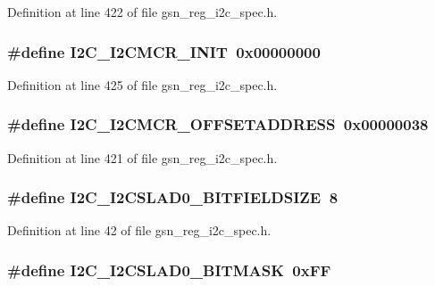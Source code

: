 Definition at line 422 of file gsn\_\-reg\_\-i2c\_\-spec.h.

\hypertarget{a00558_a619479ba7fc7ed7ca7f09d41a08fec86}{
\subsubsection[{I2C\_\-I2CMCR\_\-INIT}]{\setlength{\rightskip}{0pt plus 5cm}\#define I2C\_\-I2CMCR\_\-INIT~0x00000000}}
\label{a00558_a619479ba7fc7ed7ca7f09d41a08fec86}


Definition at line 425 of file gsn\_\-reg\_\-i2c\_\-spec.h.

\hypertarget{a00558_a7c8d88c13df3cf38f1ce4a66bae7abb4}{
\subsubsection[{I2C\_\-I2CMCR\_\-OFFSETADDRESS}]{\setlength{\rightskip}{0pt plus 5cm}\#define I2C\_\-I2CMCR\_\-OFFSETADDRESS~0x00000038}}
\label{a00558_a7c8d88c13df3cf38f1ce4a66bae7abb4}


Definition at line 421 of file gsn\_\-reg\_\-i2c\_\-spec.h.

\hypertarget{a00558_aa7c527f9286485d4a2162c2907c4386d}{
\subsubsection[{I2C\_\-I2CSLAD0\_\-BITFIELDSIZE}]{\setlength{\rightskip}{0pt plus 5cm}\#define I2C\_\-I2CSLAD0\_\-BITFIELDSIZE~8}}
\label{a00558_aa7c527f9286485d4a2162c2907c4386d}


Definition at line 42 of file gsn\_\-reg\_\-i2c\_\-spec.h.

\hypertarget{a00558_a3fdc43d203d00fa8135356b8c8799496}{
\subsubsection[{I2C\_\-I2CSLAD0\_\-BITMASK}]{\setlength{\rightskip}{0pt plus 5cm}\#define I2C\_\-I2CSLAD0\_\-BITMASK~0xFF}}
\label{a00558_a3fdc43d203d00fa8135356b8c8799496}



